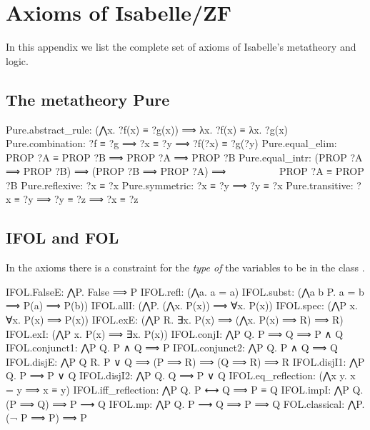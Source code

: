 \section{Axioms of Isabelle/ZF}
\label{appendix:axioms}

In this appendix we list the complete set of axioms of Isabelle's
metatheory and logic.

\subsection{The metatheory Pure}
\begin{isabelle}
Pure.abstract\_rule: (⋀x. ?f(x) ≡ ?g(x)) ⟹ λx. ?f(x) ≡ λx. ?g(x)\isanewline
Pure.combination: ?f ≡ ?g ⟹ ?x ≡ ?y ⟹ ?f(?x) ≡ ?g(?y)\isanewline
Pure.equal\_elim: PROP ?A ≡ PROP ?B ⟹ PROP ?A ⟹ PROP ?B\isanewline
Pure.equal\_intr: (PROP ?A ⟹ PROP ?B) ⟹ (PROP ?B ⟹ PROP ?A) ⟹ \isanewline
\ \ \ \ \ \ \ \ \ \ PROP ?A ≡ PROP ?B\isanewline
Pure.reflexive: ?x ≡ ?x\isanewline
Pure.symmetric: ?x ≡ ?y ⟹ ?y ≡ ?x\isanewline
Pure.transitive: ?x ≡ ?y ⟹ ?y ≡ ?z ⟹ ?x ≡ ?z
\end{isabelle}

\subsection{IFOL and FOL}
In the axioms  there is a constraint
for the \emph{type of} the variables  to be in the class .
\begin{isabelle}
IFOL.FalseE: ⋀P. False ⟹ P\isanewline
IFOL.refl:  (⋀a. a = a)\isanewline
IFOL.subst: (⋀a b P. a = b ⟹ P(a) ⟹ P(b))\isanewline
IFOL.allI:  (⋀P. (⋀x. P(x)) ⟹ ∀x. P(x))\isanewline
IFOL.spec:  (⋀P x. ∀x. P(x) ⟹ P(x))\isanewline
IFOL.exE:   (⋀P R. ∃x. P(x) ⟹ (⋀x. P(x) ⟹ R) ⟹ R)\isanewline
IFOL.exI:   (⋀P x. P(x) ⟹ ∃x. P(x))\isanewline
IFOL.conjI: ⋀P Q. P ⟹ Q ⟹ P ∧ Q\isanewline
IFOL.conjunct1: ⋀P Q. P ∧ Q ⟹ P\isanewline
IFOL.conjunct2: ⋀P Q. P ∧ Q ⟹ Q\isanewline
IFOL.disjE: ⋀P Q R. P ∨ Q ⟹ (P ⟹ R) ⟹ (Q ⟹ R) ⟹ R\isanewline
IFOL.disjI1: ⋀P Q. P ⟹ P ∨ Q\isanewline
IFOL.disjI2: ⋀P Q. Q ⟹ P ∨ Q\isanewline
IFOL.eq\_reflection: (⋀x y. x = y ⟹ x ≡ y)\isanewline
IFOL.iff\_reflection: ⋀P Q. P ⟷ Q ⟹ P ≡ Q\isanewline
IFOL.impI: ⋀P Q. (P ⟹ Q) ⟹ P ⟶ Q\isanewline
IFOL.mp: ⋀P Q. P ⟶ Q ⟹ P ⟹ Q\isanewline%
FOL.classical: ⋀P. (¬ P ⟹ P) ⟹ P
\end{isabelle}

